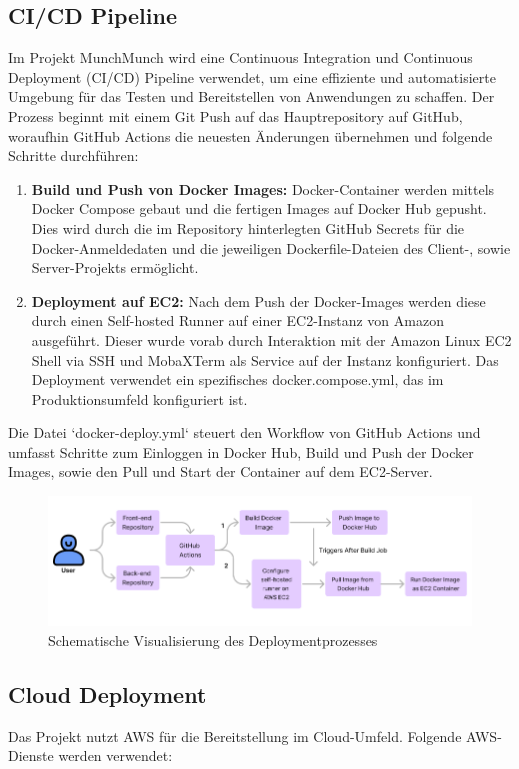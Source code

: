 \documentclass[conference,a4paper,flushend]{cs-techrep}
\begin{document}
\subsection{CI/CD Pipeline}
Im Projekt MunchMunch wird eine Continuous Integration und Continuous Deployment (CI/CD) Pipeline verwendet, um eine effiziente und automatisierte Umgebung für das Testen und Bereitstellen von Anwendungen zu schaffen. Der Prozess beginnt mit einem Git Push auf das Hauptrepository auf GitHub, woraufhin GitHub Actions die neuesten Änderungen übernehmen und folgende Schritte durchführen:

\begin{enumerate}
  \item \textbf{Build und Push von Docker Images:} Docker-Container werden mittels Docker Compose gebaut und die fertigen Images auf Docker Hub gepusht. Dies wird durch die im Repository hinterlegten GitHub Secrets für die Docker-Anmeldedaten und die jeweiligen Dockerfile-Dateien des Client-, sowie Server-Projekts ermöglicht.
  \item \textbf{Deployment auf EC2:} Nach dem Push der Docker-Images werden diese durch einen Self-hosted Runner auf einer EC2-Instanz von Amazon\cite{Amazon} ausgeführt. Dieser wurde vorab durch Interaktion mit der Amazon Linux EC2 Shell via SSH und MobaXTerm als Service auf der Instanz konfiguriert. Das Deployment verwendet ein spezifisches docker.compose.yml, das im Produktionsumfeld konfiguriert ist.
\end{enumerate}

Die Datei `docker-deploy.yml` steuert den Workflow von GitHub Actions und umfasst Schritte zum Einloggen in Docker Hub, Build und Push der Docker Images, sowie den Pull und Start der Container auf dem EC2-Server.

\begin{figure}[h]
    \centering
    \includegraphics[width=1\linewidth]{cloud-deployment.png}
    \caption{Schematische Visualisierung des Deploymentprozesses}
    \label{fig:enter-label}
\end{figure}

\subsection{Cloud Deployment}
Das Projekt nutzt AWS für die Bereitstellung im Cloud-Umfeld. Folgende AWS-Dienste werden verwendet:
\end{document}
